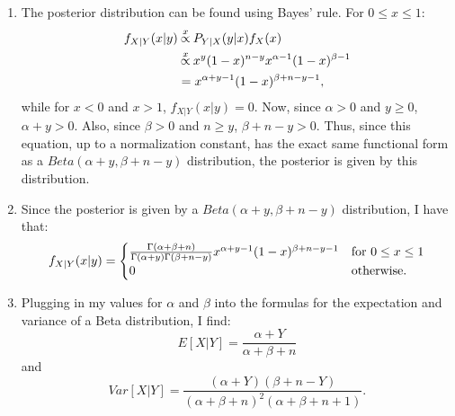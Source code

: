\begin{problem}{18} $ $
\begin{enumerate}

\item The posterior distribution can be found using Bayes' rule.  For $ 0 \le x\le 1:$
\begin{align*}
f_{X|Y}(x|y) & \propof{x} P_{Y|X}(y|x)f_X(x) \\
& \propof{x}x^y(1-x)^{n-y}x^{\alpha-1}(1-x)^{\beta-1} \\
& = x^{\alpha+y-1}(1-x)^{\beta+n-y-1},
\end{align*}
while for $x <0 $ and $x>1 $, $f_{X|Y}(x|y) =0$.  Now, since $\alpha>0$ and $y \ge 0$, $\alpha+y >0$.  Also, since $\beta>0$ and $n \ge y$, $\beta+n-y >0$.  Thus, since this equation, up to a normalization constant, has the exact same functional form as a $Beta(\alpha+y,\beta+n-y)$ distribution, the posterior is given by this distribution.

\item Since the posterior is given by a $Beta(\alpha+y,\beta+n-y)$ distribution, I have that:
\[
f_{X|Y}(x|y)=
  \begin{cases}
                                   \frac{\Gamma(\alpha+\beta+n)}{\Gamma(\alpha+y)\Gamma(\beta+n-y)} x^{\alpha+y-1}(1-x)^{\beta+n-y-1}& \text{for $ 0 \le x\le 1$} \\
                                   0 & \text{otherwise}.
  \end{cases}
\]

\item Plugging in my values for $\alpha$ and $\beta$ into the formulas for the expectation and variance of a Beta distribution, I find:
\begin{equation*}
E[X|Y] = \frac{\alpha+Y}{\alpha+\beta +n}
\end{equation*}
and
\begin{equation*}
Var[X|Y] = \frac{(\alpha+Y)(\beta+n-Y)}{(\alpha+\beta +n)^2(\alpha+\beta+n+1)}.
\end{equation*}

\end{enumerate}
\end{problem}




